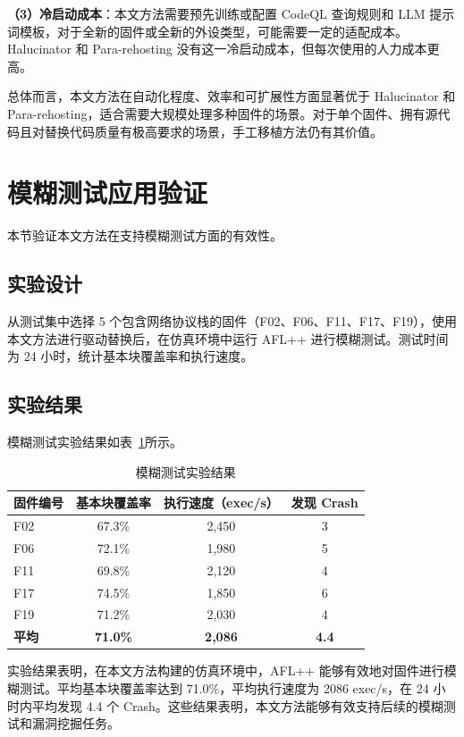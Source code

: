 \textbf{（3）冷启动成本}：本文方法需要预先训练或配置 CodeQL 查询规则和 LLM 提示词模板，对于全新的固件或全新的外设类型，可能需要一定的适配成本。Halucinator 和 Para-rehosting 没有这一冷启动成本，但每次使用的人力成本更高。

总体而言，本文方法在自动化程度、效率和可扩展性方面显著优于 Halucinator 和 Para-rehosting，适合需要大规模处理多种固件的场景。对于单个固件、拥有源代码且对替换代码质量有极高要求的场景，手工移植方法仍有其价值。

\section{模糊测试应用验证}
\label{sec:fuzz_eval}

本节验证本文方法在支持模糊测试方面的有效性。

\subsection{实验设计}

从测试集中选择 5 个包含网络协议栈的固件（F02、F06、F11、F17、F19），使用本文方法进行驱动替换后，在仿真环境中运行 AFL++ 进行模糊测试。测试时间为 24 小时，统计基本块覆盖率和执行速度。

\subsection{实验结果}

模糊测试实验结果如表~\ref{tab:fuzz_results}所示。

\begin{table}[htbp]
\centering
\caption{模糊测试实验结果}
\label{tab:fuzz_results}
\begin{tabular}{lccc}
\toprule
\textbf{固件编号} & \textbf{基本块覆盖率} & \textbf{执行速度（exec/s）} & \textbf{发现 Crash} \\
\midrule
F02 & 67.3\% & 2,450 & 3 \\
F06 & 72.1\% & 1,980 & 5 \\
F11 & 69.8\% & 2,120 & 4 \\
F17 & 74.5\% & 1,850 & 6 \\
F19 & 71.2\% & 2,030 & 4 \\
\midrule
\textbf{平均} & \textbf{71.0\%} & \textbf{2,086} & \textbf{4.4} \\
\bottomrule
\end{tabular}
\end{table}

实验结果表明，在本文方法构建的仿真环境中，AFL++ 能够有效地对固件进行模糊测试。平均基本块覆盖率达到 71.0\%，平均执行速度为 2086 exec/s，在 24 小时内平均发现 4.4 个 Crash。这些结果表明，本文方法能够有效支持后续的模糊测试和漏洞挖掘任务。

